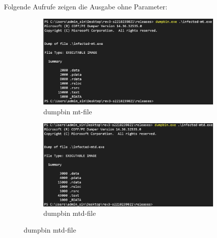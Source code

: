 \documentclass{article}
\begin{document}
	\noindent Folgende Aufrufe zeigen die Ausgabe ohne Parameter:\\
	\begin{figure}[htp]
		\centering
		\begin{subfigure}[b]{0.45\textwidth}
			\includegraphics[width=\textwidth]{pictures/1. dumpbin mt.png}
			\caption{dumpbin mt-file}
			\label{fig:image1}
		\end{subfigure}
		\hfill
		\begin{subfigure}[b]{0.45\textwidth}
			\includegraphics[width=\textwidth]{pictures/1. dumpbin mtd.png}
			\caption{dumpbin mtd-file}
			\label{fig:image2}
		\end{subfigure}
		
		\vspace{10pt} %
		

\end{figure}
\end{document}
